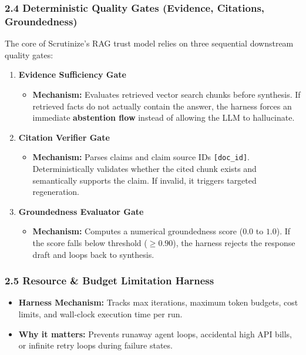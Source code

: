 \documentclass{article}
\begin{document}
\subsubsection{2.4 Deterministic Quality Gates (Evidence, Citations, Groundedness)}
The core of Scrutinize's RAG trust model relies on three sequential downstream quality gates:
\begin{enumerate}
    \item \textbf{Evidence Sufficiency Gate}
    \begin{itemize}
        \item \textbf{Mechanism:} Evaluates retrieved vector search chunks before synthesis. If retrieved facts do not actually contain the answer, the harness forces an immediate \textbf{abstention flow} instead of allowing the LLM to hallucinate.
    \end{itemize}
    \item \textbf{Citation Verifier Gate}
    \begin{itemize}
        \item \textbf{Mechanism:} Parses claims and claim source IDs \texttt{[doc\_id]}. Deterministically validates whether the cited chunk exists and semantically supports the claim. If invalid, it triggers targeted regeneration.
    \end{itemize}
    \item \textbf{Groundedness Evaluator Gate}
    \begin{itemize}
        \item \textbf{Mechanism:} Computes a numerical groundedness score ($0.0$ to $1.0$). If the score falls below threshold ($\ge 0.90$), the harness rejects the response draft and loops back to synthesis.
    \end{itemize}
\end{enumerate}

\subsubsection{2.5 Resource \& Budget Limitation Harness}
\begin{itemize}
    \item \textbf{Harness Mechanism:} Tracks max iterations, maximum token budgets, cost limits, and wall-clock execution time per run.
    \item \textbf{Why it matters:} Prevents runaway agent loops, accidental high API bills, or infinite retry loops during failure states.
\end{itemize}
\end{document}
